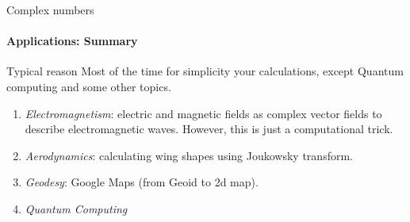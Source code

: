 \documentclass[aspectratio=169]{beamer}
\begin{document}
\begin{frame}[t]{Complex numbers}
\framesubtitle{Applications: Summary}
\vspace{-0.4cm}
\large
\begin{block}{Typical reason}
    Most of the time for simplicity your calculations, except Quantum computing and some other topics.
\end{block}
    \begin{enumerate}
        \item \textit{Electromagnetism}: electric and magnetic fields as complex vector fields to describe electromagnetic waves. However, this is just a computational trick.
        \item \textit{Aerodynamics}: calculating wing shapes using Joukowsky transform.
        \item \textit{Geodesy}: Google Maps (from Geoid to 2d map).
        \item \textit{Quantum Computing}
    \end{enumerate}
\end{frame}
\end{document}
